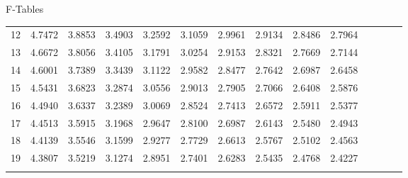 \begin{frame}{F-Tables}
{\begin{tabular}{l|lllllllllllll}
 12 & 4.7472 & 3.8853 & 3.4903 & 3.2592 & 3.1059 & 2.9961 & 2.9134 & 2.8486 & 2.7964 \\[2pt] \arrayrulecolor{light-gray}\hline\arrayrulecolor{black}  
 13 & 4.6672 & 3.8056 & 3.4105 & 3.1791 & 3.0254 & 2.9153 & 2.8321 & 2.7669 & 2.7144 \\[2pt] \arrayrulecolor{light-gray}\hline\arrayrulecolor{black}  
 14 & 4.6001 & 3.7389 & 3.3439 & 3.1122 & 2.9582 & 2.8477 & 2.7642 & 2.6987 & 2.6458 \\[2pt] \arrayrulecolor{light-gray}\hline\arrayrulecolor{black}  
 15 & 4.5431 & 3.6823 & 3.2874 & 3.0556 & 2.9013 & 2.7905 & 2.7066 & 2.6408 & 2.5876 \\[2pt] \arrayrulecolor{light-gray}\hline\arrayrulecolor{black}  
 16 & 4.4940 & 3.6337 & 3.2389 & 3.0069 & 2.8524 & 2.7413 & 2.6572 & 2.5911 & 2.5377 \\[2pt] \arrayrulecolor{light-gray}\hline\arrayrulecolor{black}  
 17 & 4.4513 & 3.5915 & 3.1968 & 2.9647 & 2.8100 & 2.6987 & 2.6143 & 2.5480 & 2.4943 \\[2pt] \arrayrulecolor{light-gray}\hline\arrayrulecolor{black}  
 18 & 4.4139 & 3.5546 & 3.1599 & 2.9277 & 2.7729 & 2.6613 & 2.5767 & 2.5102 & 2.4563 \\[2pt] \arrayrulecolor{light-gray}\hline\arrayrulecolor{black}  
 19 & 4.3807 & 3.5219 & 3.1274 & 2.8951 & 2.7401 & 2.6283 & 2.5435 & 2.4768 & 2.4227 \\[2pt] \arrayrulecolor{light-gray}\hline\arrayrulecolor{black}  
   \end{tabular}
}
  
\end{frame}


